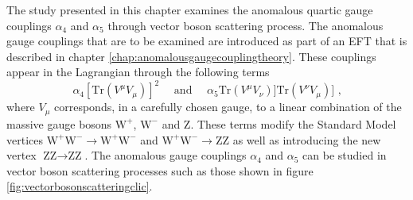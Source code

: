 The study presented in this chapter examines the anomalous quartic gauge couplings $\alpha_{4}$ and $\alpha_{5}$ through vector boson scattering process.  The anomalous gauge couplings that are to be examined are introduced as part of an EFT that is described in chapter \ref{chap:anomalousgaugecouplingtheory}.  These couplings appear in the Lagrangian through the following terms
%
\begin{equation}
\alpha_{4}[\text{Tr}(V^{\mu}V_{\mu})]^{2} \quad \text{ and } \quad \alpha_{5}\text{Tr}(V^{\mu}V_{\nu})] \text{Tr}(V^{\nu}V_{\mu})]\text{ ,}
\end{equation}
%
\noindent where $V_{\mu}$ corresponds, in a carefully chosen gauge, to a linear combination of the massive gauge bosons $\text{W}^{+}$, $\text{W}^{-}$ and Z.  These terms modify the Standard Model vertices $\text{W}^{+}\text{W}^{-} \rightarrow \text{W}^{+}\text{W}^{-}$ and $\text{W}^{+}\text{W}^{-} \rightarrow \text{Z}\text{Z}$ as well as introducing the new vertex $\text{Z}\text{Z} \rightarrow \text{Z}\text{Z}$.  The anomalous gauge couplings $\alpha_{4}$ and $\alpha_{5}$ can be studied in vector boson scattering processes such as those shown in figure \ref{fig:vectorbosonscatteringclic}.  

